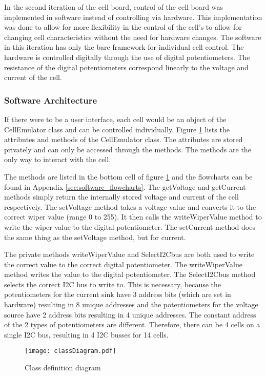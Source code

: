 In the second iteration of the cell board, control of the cell board was implemented in software instead of controlling via hardware.
This implementation was done to allow for more flexibility in the control of the cell's to allow for changing cell characteristics without the need for hardware changes.
The software in this iteration has only the bare framework for individual cell control.
The hardware is controlled digitally through the use of digital potentiometers. The resistance of the digital potentiometers correspond linearly to the voltage and current of the cell.

\subsubsection{Software Architecture}
If there were to be a user interface, each cell would be an object of the CellEmulator class and can be controlled individually. Figure \ref{fig:classDiagram} lists the attributes and methods of the CellEmulator class. The attributes are stored privately and can only be accessed through the methods. The methods are the only way to interact with the cell. 

The methods are listed in the bottom cell of figure \ref{fig:classDiagram} and the flowcharts can be found in Appendix \ref{sec:software_flowcharts}. The getVoltage and getCurrent methods simply return the internally stored voltage and current of the cell respectively. The setVoltage method takes a voltage value and converts it to the correct wiper value (range 0 to 255). It then calls the writeWiperValue method to write the wiper value to the digital potentiometer. The setCurrent method does the same thing as the setVoltage method, but for current.

The private methods writeWiperValue and SelectI2Cbus are both used to write the correct value to the correct digital potentiometer. The writeWiperValue method writes the value to the digital potentiometer. The SelectI2Cbus method selects the correct I2C bus to write to. 
This is necessary, because the potentiometers for the current sink have 3 address bits (which are set in hardware) resulting in 8 unique addresses and the potentiometers for the voltage source have 2 address bits resulting in 4 unique addresses. The constant address of the 2 types of potentiometers are different. Therefore, there can be 4 cells on a single I2C bus, resulting in 4 I2C busses for 14 cells. 

\begin{figure}[ht!]
    \centering
    \texttt{[image: classDiagram.pdf]}
    \caption{Class definition diagram}
    \label{fig:classDiagram}
\end{figure}